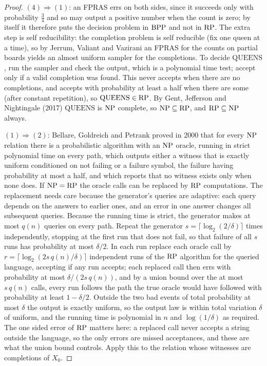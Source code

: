 \begin{proof}
$(4) \Rightarrow (1)$: an FPRAS errs on both sides, since it succeeds only with probability $\tfrac34$ and so may output a positive number when the count is zero; by itself it therefore puts the decision problem in $\mathrm{BPP}$ and not in $\mathrm{RP}$. The extra step is self reducibility: the completion problem is self reducible (fix one queen at a time), so by Jerrum, Valiant and Vazirani \cite{JVV} an FPRAS for the counts on partial boards yields an almost uniform sampler for the completions. To decide $\mathrm{QUEENS}$, run the sampler and check the output, which is a polynomial time test; accept only if a valid completion was found. This never accepts when there are no completions, and accepts with probability at least a half when there are some (after constant repetition), so $\mathrm{QUEENS} \in \mathrm{RP}$. By Gent, Jefferson and Nightingale \cite{GJN} (2017) $\mathrm{QUEENS}$ is $\mathrm{NP}$ complete, so $\mathrm{NP} \subseteq \mathrm{RP}$, and $\mathrm{RP} \subseteq \mathrm{NP}$ always.

$(1) \Rightarrow (2)$: Bellare, Goldreich and Petrank \cite{BGP} proved in 2000 that for every $\mathrm{NP}$ relation there is a probabilistic algorithm with an $\mathrm{NP}$ oracle, running in strict polynomial time on every path, which outputs either a witness that is exactly uniform conditioned on not failing or a failure symbol, the failure having probability at most a half, and which reports that no witness exists only when none does. If $\mathrm{NP} = \mathrm{RP}$ the oracle calls can be replaced by $\mathrm{RP}$ computations. The replacement needs care because the generator's queries are adaptive: each query depends on the answers to earlier ones, and an error in one answer changes all subsequent queries. Because the running time is strict, the generator makes at most $q(n)$ queries on every path. Repeat the generator $s = \lceil \log_2 (2/\delta) \rceil$ times independently, stopping at the first run that does not fail, so that failure of all $s$ runs has probability at most $\delta / 2$. In each run replace each oracle call by $r = \lceil \log_2 (2 s\, q(n) / \delta) \rceil$ independent runs of the $\mathrm{RP}$ algorithm for the queried language, accepting if any run accepts; each replaced call then errs with probability at most $\delta / (2 s\, q(n))$, and by a union bound over the at most $s\, q(n)$ calls, every run follows the path the true oracle would have followed with probability at least $1 - \delta/2$. Outside the two bad events of total probability at most $\delta$ the output is exactly uniform, so the output law is within total variation $\delta$ of uniform, and the running time is polynomial in $n$ and $\log(1/\delta)$ as required. The one sided error of $\mathrm{RP}$ matters here: a replaced call never accepts a string outside the language, so the only errors are missed acceptances, and these are what the union bound controls. Apply this to the relation whose witnesses are completions of $X_0$.


\end{proof}
